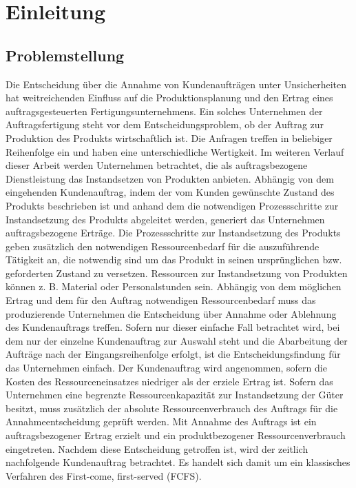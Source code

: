 \chapter{Einleitung}

\section{Problemstellung}

Die Entscheidung über die Annahme von Kundenaufträgen unter Unsicherheiten hat weitreichenden Einfluss auf die Produktionsplanung und den Ertrag eines auftragsgesteuerten Fertigungsunternehmens. Ein solches Unternehmen der Auftragsfertigung steht vor dem Entscheidungsproblem, ob der Auftrag zur Produktion des Produkts wirtschaftlich ist. Die Anfragen treffen in beliebiger Reihenfolge ein und haben eine unterschiedliche Wertigkeit. Im weiteren Verlauf dieser Arbeit werden Unternehmen betrachtet, die als auftragsbezogene Dienstleistung das Instandsetzen von Produkten anbieten. Abhängig von dem eingehenden Kundenauftrag, indem der vom Kunden gewünschte Zustand des Produkts beschrieben ist und anhand dem die notwendigen Prozessschritte zur Instandsetzung des Produkts abgeleitet werden, generiert das Unternehmen auftragsbezogene Erträge. Die Prozessschritte zur Instandsetzung des Produkts geben zusätzlich den notwendigen Ressourcenbedarf für die auszuführende Tätigkeit an, die notwendig sind um das Produkt in seinen ursprünglichen bzw. geforderten Zustand zu versetzen. Ressourcen zur Instandsetzung von Produkten können z. B. Material oder Personalstunden sein. Abhängig von dem möglichen Ertrag und dem für den Auftrag notwendigen Ressourcenbedarf muss das produzierende Unternehmen die Entscheidung über Annahme oder Ablehnung des Kundenauftrags treffen. Sofern nur dieser einfache Fall betrachtet wird, bei dem nur der einzelne Kundenauftrag zur Auswahl steht und die Abarbeitung der Aufträge nach der Eingangsreihenfolge erfolgt, ist die Entscheidungsfindung für das Unternehmen einfach. Der Kundenauftrag wird angenommen, sofern die Kosten des Ressourceneinsatzes niedriger als der erziele Ertrag ist.
Sofern das Unternehmen eine begrenzte Ressourcenkapazität zur Instandsetzung der Güter besitzt, muss zusätzlich der absolute Ressourcenverbrauch des Auftrags für die Annahmeentscheidung geprüft werden. Mit Annahme des Auftrags ist ein auftragsbezogener Ertrag erzielt und ein produktbezogener Ressourcenverbrauch eingetreten. Nachdem diese Entscheidung getroffen ist, wird der zeitlich nachfolgende Kundenauftrag betrachtet. Es handelt sich damit um ein klassisches Verfahren des \glqq First-come, first-served (FCFS){\grqq}.

